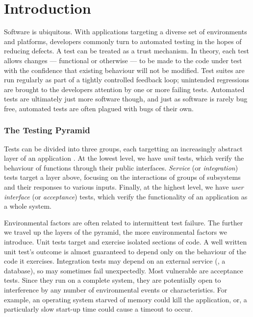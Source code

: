 \section{Introduction}
\label{sec:intro}

Software is ubiquitous. With applications targeting a diverse set of
environments and platforms, developers commonly turn to automated testing in the
hopes of reducing defects. A test can be treated as a trust mechanism. In
theory, each test allows changes --- functional or otherwise --- to be made to
the code under test with the confidence that existing behaviour will not be
modified. Test suites are run regularly as part of a tightly controlled feedback
loop; unintended regressions are brought to the developers attention by one or
more failing tests. Automated tests are ultimately just more software though,
and just as software is rarely bug free, automated tests are often plagued with
bugs of their own.

\subsubsection{The Testing Pyramid}
\label{sec:sec:sec:the_testing_pyramid}

Tests can be divided into three groups, each targetting an increasingly abstract
layer of an application \citep[see][Chapter~16]{cohn2009succeeding}. At the
lowest level, we have \emph{unit} tests, which verify the behaviour of functions
through their public interfaces. \emph{Service} (or \emph{integration}) tests
target a layer above, focusing on the interactions of groups of subsystems and
their responses to various inputs. Finally, at the highest level, we have
\emph{user interface} (or \emph{acceptance}) tests, which verify the
functionality of an application as a whole system.

Environmental factors are often related to intermittent test failure. The
further we travel up the layers of the pyramid, the more environmental factors
we introduce. Unit tests target and exercise isolated sections of code. A well
written unit test's outcome is almost guaranteed to depend only on the behaviour
of the code it exercises. Integration tests may depend on an external service
(\eg, a database), so may sometimes fail unexpectedly. Most vulnerable are
acceptance tests. Since they run on a complete system, they are potentially open
to interference by any number of environmental events or characteristics. For
example, an operating system starved of memory could kill the application, or, a
particularly slow start-up time could cause a timeout to occur.

